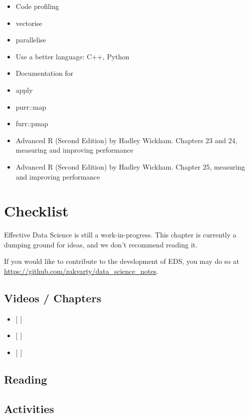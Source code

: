\documentclass[
  12pt,
]{book}
\begin{document}
\begin{itemize}
\item
  Code profiling
\item
  vectorise
\item
  parallelise
\item
  Use a better language: C++, Python
\item
  Documentation for
\item
  apply
\item
  purr::map
\item
  furr::pmap
\item
  Advanced R (Second Edition) by Hadley Wickham. Chapters 23 and 24, measuring and improving performance
\item
  Advanced R (Second Edition) by Hadley Wickham. Chapter 25, measuring and improving performance
\end{itemize}

\hypertarget{production-checklist}{%
\chapter*{Checklist}\label{production-checklist}}

Effective Data Science is still a work-in-progress. This chapter is currently a dumping ground for ideas, and we don't recommend reading it.

If you would like to contribute to the development of EDS, you may do so at \url{https://github.com/zakvarty/data_science_notes}.

\hypertarget{videos-chapters-3}{%
\section{Videos / Chapters}\label{videos-chapters-3}}

\begin{itemize}
\item
  {[} {]}
\item
  {[} {]}
\item
  {[} {]}
\end{itemize}

\hypertarget{reading-3}{%
\section{Reading}\label{reading-3}}

\hypertarget{activities-1}{%
\section{Activities}\label{activities-1}}
\end{document}
